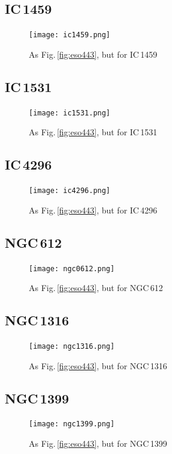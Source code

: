 \documentclass[a4paper,fleqn,usenatbib]{mnras}
\begin{document}
	\subsection{IC\,1459}
		\begin{figure}
			\centering
			\texttt{[image: ic1459.png]}
			\caption{As Fig.\,\ref{fig:eso443}, but for IC\,1459}
		\end{figure}

	\subsection{IC\,1531}
		\begin{figure}
			\centering
			\texttt{[image: ic1531.png]}
			\caption{As Fig.\,\ref{fig:eso443}, but for IC\,1531}
		\end{figure}

	\subsection{IC\,4296}
		\begin{figure}
			\centering
			\texttt{[image: ic4296.png]}
			\caption{As Fig.\,\ref{fig:eso443}, but for IC\,4296}
		\end{figure}

	\subsection{NGC\,612}
		\begin{figure}
			\centering
			\texttt{[image: ngc0612.png]}
			\caption{As Fig.\,\ref{fig:eso443}, but for NGC\,612}
		\end{figure}

	\subsection{NGC\,1316}
		\begin{figure}
			\centering
			\texttt{[image: ngc1316.png]}
			\caption{As Fig.\,\ref{fig:eso443}, but for NGC\,1316}
		\end{figure}

	\subsection{NGC\,1399}
		\begin{figure}
			\centering
			\texttt{[image: ngc1399.png]}
			\caption{As Fig.\,\ref{fig:eso443}, but for NGC\,1399}
		\end{figure}
\end{document}
